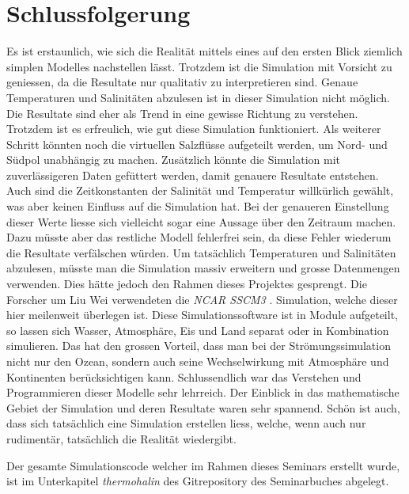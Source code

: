 \section{Schlussfolgerung}

Es ist erstaunlich, wie sich die Realität mittels eines auf den ersten Blick ziemlich simplen Modelles nachstellen lässt. Trotzdem ist die Simulation mit Vorsicht zu geniessen, da die Resultate nur qualitativ zu interpretieren sind. Genaue Temperaturen und Salinitäten abzulesen ist in dieser Simulation nicht möglich. Die Resultate sind eher als Trend in eine gewisse Richtung zu verstehen. Trotzdem ist es erfreulich, wie gut diese Simulation funktioniert. 
Als weiterer Schritt könnten noch die virtuellen Salzflüsse aufgeteilt werden, um Nord- und Südpol unabhängig zu machen. Zusätzlich könnte die Simulation mit zuverlässigeren Daten gefüttert werden, damit genauere Resultate entstehen. Auch sind die Zeitkonstanten der Salinität und Temperatur willkürlich gewählt, was aber keinen Einfluss auf die Simulation hat. Bei der genaueren Einstellung dieser Werte liesse sich vielleicht sogar eine Aussage über den Zeitraum machen. Dazu müsste aber das restliche Modell fehlerfrei sein, da diese Fehler wiederum die Resultate verfälschen würden.
Um tatsächlich Temperaturen und Salinitäten abzulesen, müsste man die Simulation massiv erweitern und grosse Datenmengen verwenden. Dies hätte jedoch den Rahmen dieses Projektes gesprengt. 
Die Forscher um Liu Wei \cite{thermohalin:liuwei} verwendeten die {\em NCAR SSCM3} \cite{thermohalin:sim}. Simulation, welche dieser hier meilenweit überlegen ist. Diese Simulationssoftware ist in Module aufgeteilt, so lassen sich Wasser, Atmosphäre, Eis und Land separat oder in Kombination simulieren. Das hat den grossen Vorteil, dass man bei der Strömungssimulation nicht nur den Ozean, sondern auch seine Wechselwirkung mit Atmosphäre und Kontinenten berücksichtigen kann. 
Schlussendlich war das Verstehen und Programmieren dieser Modelle sehr lehrreich. Der Einblick in das mathematische Gebiet der Simulation und deren Resultate waren sehr spannend. Schön ist auch, dass sich tatsächlich eine Simulation erstellen liess, welche, wenn auch nur rudimentär, tatsächlich die Realität wiedergibt.

Der gesamte Simulationscode welcher im Rahmen dieses Seminars erstellt wurde, ist im Unterkapitel {\em thermohalin} des Gitrepository des Seminarbuches abgelegt\cite{thermohalin:gitrepo-klimawandel}.
